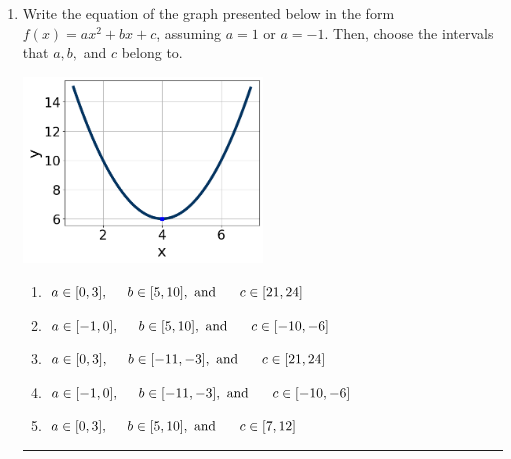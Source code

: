 \documentclass[14pt]{extbook}
\newcommand{\litem}[1]{\item#1\hspace*{-1cm}\rule{\textwidth}{0.4pt}}
\begin{document}
\begin{enumerate}
{\begin{enumerate}[label=\Alph*.]
\end{enumerate} }
\litem{
Write the equation of the graph presented below in the form $f(x)=ax^2+bx+c$, assuming  $a=1$ or $a=-1$. Then, choose the intervals that $a, b,$ and $c$ belong to.
\begin{center}
    \includegraphics[width=0.5\textwidth]{../Figures/quadraticGraphToEquationCopyA.png}
\end{center}
\begin{enumerate}[label=\Alph*.]
\item \( a \in [0, 3], \hspace*{5mm} b \in [5, 10], \text{ and } \hspace*{5mm} c \in [21, 24] \)
\item \( a \in [-1, 0], \hspace*{5mm} b \in [5, 10], \text{ and } \hspace*{5mm} c \in [-10, -6] \)
\item \( a \in [0, 3], \hspace*{5mm} b \in [-11, -3], \text{ and } \hspace*{5mm} c \in [21, 24] \)
\item \( a \in [-1, 0], \hspace*{5mm} b \in [-11, -3], \text{ and } \hspace*{5mm} c \in [-10, -6] \)
\item \( a \in [0, 3], \hspace*{5mm} b \in [5, 10], \text{ and } \hspace*{5mm} c \in [7, 12] \)


\end{enumerate}}
\end{enumerate}
\end{document}
